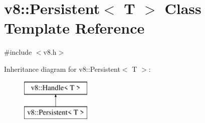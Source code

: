 \hypertarget{classv8_1_1_persistent}{}\section{v8\+:\+:Persistent$<$ T $>$ Class Template Reference}
\label{classv8_1_1_persistent}


{\ttfamily \#include $<$v8.\+h$>$}

Inheritance diagram for v8\+:\+:Persistent$<$ T $>$\+:\begin{figure}[H]
\begin{center}
\leavevmode
\includegraphics[height=2.000000cm]{classv8_1_1_persistent}
\end{center}
\end{figure}
